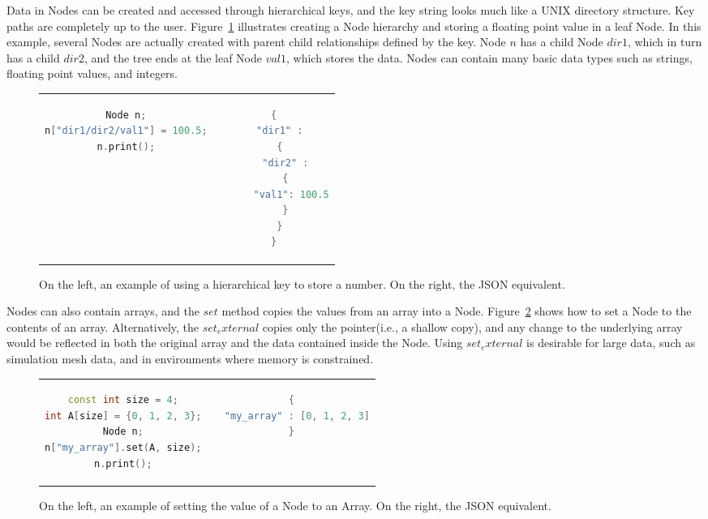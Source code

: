 Data in Nodes can be created and accessed through hierarchical keys,
and the key string looks much like a UNIX directory structure.
%
Key paths are completely up to the user.
%
Figure~\ref{ex:2} illustrates creating a Node hierarchy
and storing a floating point value in a leaf Node.
%
In this example, several Nodes are actually created with parent child
relationships defined by the key.
%
Node $n$ has a child Node $dir1$, which in turn has a child $dir2$,
and the tree ends at the leaf Node $val1$, which stores the data.
%
Nodes can contain many basic data types such as strings,
floating point values, and integers.

\begin{figure}
\begin{tabular}{cc}
  \begin{minipage}{.5\textwidth}
  \centering
    \begin{lstlisting}[language=C++]
Node n;
n["dir1/dir2/val1"] = 100.5;
n.print();
    \end{lstlisting}
  \end{minipage}
  &
  \begin{minipage}{.5\textwidth}
  \centering
  \begin{lstlisting}[language=C++]
{
  "dir1" :
  {
    "dir2" :
    {
      "val1": 100.5
    }
  }
}
  \end{lstlisting}
  \end{minipage}
\end{tabular}
\caption{\label{ex:2}On the left, an example of using a hierarchical key to store a number. On the right, the JSON equivalent.}
\end{figure}

Nodes can also contain arrays, and the $set$ method
copies the values from an array into a Node.
%
Figure~\ref{ex:3} shows how to set a Node to the contents of an array.
%
Alternatively, the $set_external$ copies only the pointer(i.e., a shallow copy),
and any change to the underlying array would be reflected in both the original
array and the data contained inside the Node.
%
Using $set_external$ is desirable for large data, such as simulation mesh data,
and in environments where memory is constrained.

\begin{figure}
\begin{tabular}{cc}
  \begin{minipage}{.5\textwidth}
  \centering
    \begin{lstlisting}[language=C++]
const int size = 4;
int A[size] = {0, 1, 2, 3};
Node n;
n["my_array"].set(A, size);
n.print();
    \end{lstlisting}
  \end{minipage}
  &
  \begin{minipage}{.5\textwidth}
  \centering
  \begin{lstlisting}[language=C++]
{
  "my_array" : [0, 1, 2, 3]
}
  \end{lstlisting}
  \end{minipage}
\end{tabular}

\caption{\label{ex:3}On the left, an example of setting the value of a Node to an Array. On the right, the JSON equivalent.}
\end{figure}

